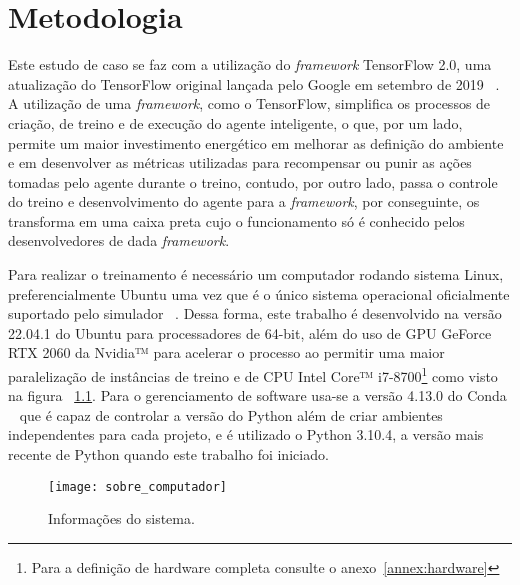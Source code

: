 

\chapter{Metodologia}
\label{cap:metodologia}

Este estudo de caso se faz com a utilização do \emph{framework} TensorFlow 2.0, uma atualização do TensorFlow original lançada pelo Google em setembro de 2019 ~\citep{TensorFlow2-release}. A utilização de uma \emph{framework}, como o TensorFlow, simplifica os processos de criação, de treino e de execução do agente inteligente, o que, por um lado, permite um maior investimento energético em melhorar as definição do ambiente e em desenvolver as métricas utilizadas para recompensar ou punir as ações tomadas pelo agente durante o treino, contudo, por outro lado, passa o controle do treino e desenvolvimento do agente para a \emph{framework}, por conseguinte, os transforma em uma caixa preta cujo o funcionamento só é conhecido pelos desenvolvedores de dada \emph{framework}.

Para realizar o treinamento é necessário um computador rodando sistema Linux, preferencialmente Ubuntu uma vez que é o único sistema operacional oficialmente suportado pelo simulador ~\citep{Duckietown-requerimentos}. Dessa forma, este trabalho é desenvolvido na versão 22.04.1 do Ubuntu para processadores de 64-bit, além do uso de GPU GeForce RTX 2060 da Nvidia™ para acelerar o processo ao permitir uma maior paralelização de instâncias de treino e de CPU Intel Core™ i7-8700\footnote{Para a definição de hardware completa consulte o anexo~\ref{annex:hardware}} como visto na figura ~\ref{fig:sobre_computador}. Para o gerenciamento de software usa-se a versão 4.13.0 do Conda ~\citep{Anaconda} que é capaz de controlar a versão do Python além de criar ambientes independentes para cada projeto, e é utilizado o Python 3.10.4, a versão mais recente de Python quando este trabalho foi iniciado.

\begin{figure}
	\centering
	\texttt{[image: sobre\_computador]}
	\caption{Informações do sistema. \label{fig:sobre_computador}}
\end{figure}

